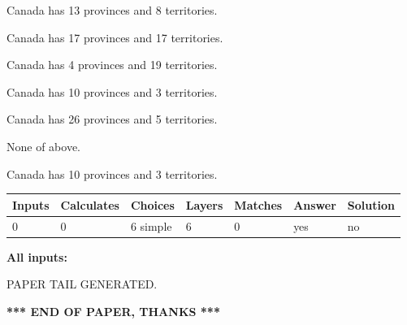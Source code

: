 \documentclass[12pt]{article}
\begin{document}
 
Canada has  13 provinces and  8 territories.
 
 
Canada has  17 provinces and  17 territories.
 
 
Canada has   4 provinces and  19 territories.
 
 
Canada has 10  provinces and 3 territories.
 
 
Canada has  26 provinces and  5 territories.
 
 
 None of above.
 
 
\noindent{}
 
 
Canada has 10  provinces and 3 territories.
 
 
\noindent{}
 
 
   
   
   
   
\noindent\begin{tabular}{|l|l|l|l|l|l|l|}
 \hline
Inputs & Calculates & Choices & Layers & Matches & Answer & Solution \\ \hline
 0  & 
 0  & 
 6
  simple  
  & 
 6  & 
 0  & 
  yes & 
  no 
  \\ \hline
 \end{tabular}
   
   
   
   
\noindent{}
   
   
   
   
\noindent\vspace{0.1in}\hspace{-0.08in} {\textbf{\Large{All inputs: }}}
   
   
   
   
   
   
 \vspace{0.2in}
 
   
   
\vspace{2.0in} PAPER TAIL GENERATED.
   
   
   
   
\vspace{1.0in} 
{\textbf{\large{ *** END OF PAPER, THANKS *** }}} 
   
\end{document}
